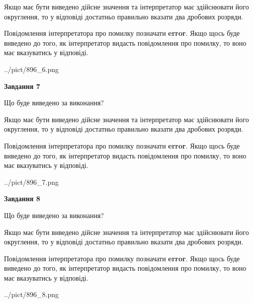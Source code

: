 \documentclass[12pt, ukrainian]{article}
\begin{document}
{\begin {Large}
Якщо має бути виведено дійсне значення та інтерпретатор має здійснювати його округлення, 
то у відповіді достатньо правильно вказати два дробових розряди.

Повідомлення інтерпретатора про помилку позначати \textbf{error}.
Якщо щось буде виведено до того, як інтерпретатор видасть повідомлення про помилку, 
то воно має вказуватись у відповіді. \par

\begin{center}
	{../pict/896_6.png}
\end{center}
\newpage

{\begin {center}\textbf{Завдання 7}\end {center}}\par
Що буде виведено за виконання? \par

Якщо має бути виведено дійсне значення та інтерпретатор має здійснювати його округлення, 
то у відповіді достатньо правильно вказати два дробових розряди.

Повідомлення інтерпретатора про помилку позначати \textbf{error}.
Якщо щось буде виведено до того, як інтерпретатор видасть повідомлення про помилку, 
то воно має вказуватись у відповіді. \par

\begin{center}
	{../pict/896_7.png}
\end{center}
\newpage

{\begin {center}\textbf{Завдання 8}\end {center}}\par
Що буде виведено за виконання? \par

Якщо має бути виведено дійсне значення та інтерпретатор має здійснювати його округлення, 
то у відповіді достатньо правильно вказати два дробових розряди.

Повідомлення інтерпретатора про помилку позначати \textbf{error}.
Якщо щось буде виведено до того, як інтерпретатор видасть повідомлення про помилку, 
то воно має вказуватись у відповіді. \par

\begin{center}
	{../pict/896_8.png}
\end{center}
\newpage


\end{Large}}
\end{document}
